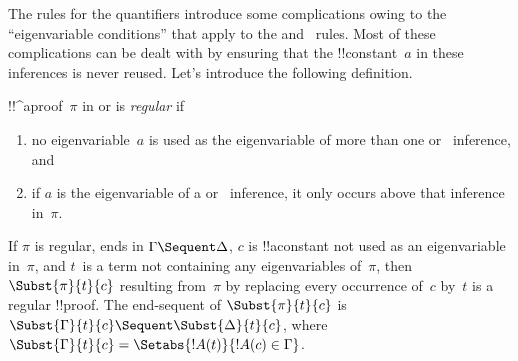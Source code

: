 \documentclass[../../../include/open-logic-section]{subfiles}
\begin{document}


The rules for the quantifiers introduce some complications owing to
the ``eigenvariable conditions'' that apply to the \LeftR{\lexists}
and~\RightR{\lforall} rules. Most of these complications can be dealt
with by ensuring that the !!{constant}~$a$ in these inferences is
never reused. Let's introduce the following definition.

\begin{defn}
!!^a{proof}~$\pi$ in  or  is \emph{regular} if
\begin{enumerate}
  \item no eigenvariable~$a$ is used as the eigenvariable of more than
  one \LeftR{\lexists} or~\RightR{\lforall} inference, and
  \item if $a$ is the eigenvariable of a \LeftR{\lexists}
  or~\RightR{\lforall} inference, it only occurs above that inference
  in~$\pi$.
\end{enumerate}
\end{defn}

\begin{lem} If $\pi$ is regular, ends in
$\Gamma \Sequent \Delta$, $c$ is !!a{constant} not used as an
eigenvariable in~$\pi$, and $t$~is a term not containing any
eigenvariables of~$\pi$, then $\Subst{\pi}{t}{c}$ resulting from~$\pi$
by replacing every occurrence of~$c$ by~$t$ is a regular !!{proof}.
The end-sequent of $\Subst{\pi}{t}{c}$ is $\Subst{\Gamma}{t}{c}
\Sequent \Subst{\Delta}{t}{c}$, where $\Subst{\Gamma}{t}{c} =
\Setabs{!A(t)}{!A(c) \in \Gamma}$.
\end{lem}
\end{document}
